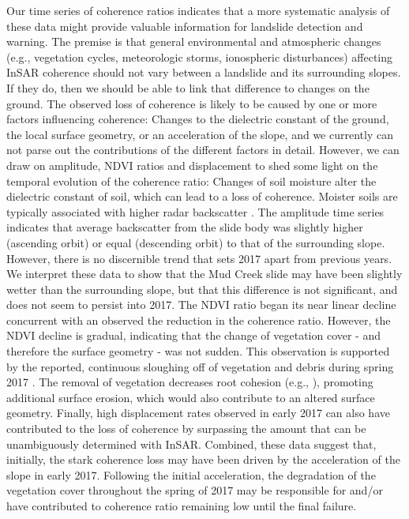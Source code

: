 \documentclass[journal abbreviation, manuscript]{copernicus}
\begin{document}
Our time series of coherence ratios indicates that a more systematic analysis of these data might provide valuable information for landslide detection and warning. The premise is that general environmental and atmospheric changes (e.g., vegetation cycles, meteorologic storms, ionospheric disturbances) affecting InSAR coherence should not vary between a landslide and its surrounding slopes. If they do, then we should be able to link that difference to changes on the ground. The observed loss of coherence is likely to be caused by one or more factors influencing coherence: Changes to the dielectric constant of the ground, the local surface geometry, or an acceleration of the slope, and we currently can not parse out the contributions of the different factors in detail. However, we can draw on amplitude, NDVI ratios and displacement to shed some light on the temporal evolution of the coherence ratio: Changes of soil moisture alter the dielectric constant of soil, which can lead to a loss of coherence. Moister soils are typically associated with higher radar backscatter \citep{oldak2003, paloscia2013}. The amplitude time series indicates that average backscatter from the slide body was slightly higher (ascending orbit) or equal (descending orbit) to that of the surrounding slope. However, there is no discernible trend that sets 2017 apart from previous years. We interpret these data to show that the Mud Creek slide may have been slightly wetter than the surrounding slope, but that this difference is not significant, and does not seem to persist into 2017. The NDVI ratio began its near linear decline concurrent with an observed the reduction in the coherence ratio. However, the NDVI decline is gradual, indicating that the change of vegetation cover - and therefore the surface geometry - was not sudden. This observation is supported by the reported, continuous sloughing off of vegetation and debris during spring 2017 \citep{Warrick2019}. The removal of vegetation decreases root cohesion (e.g., \cite{schmidt2001}), promoting additional surface erosion, which would also contribute to an altered surface geometry. Finally, high displacement rates observed in early 2017 can also have contributed to the loss of coherence by surpassing the amount that can be unambiguously determined with InSAR. Combined, these data suggest that, initially, the stark coherence loss may have been driven by the acceleration of the slope in early 2017. Following the initial acceleration, the degradation of the vegetation cover throughout the spring of 2017 may be responsible for and/or have contributed to coherence ratio remaining low until the final failure. \par
\end{document}
